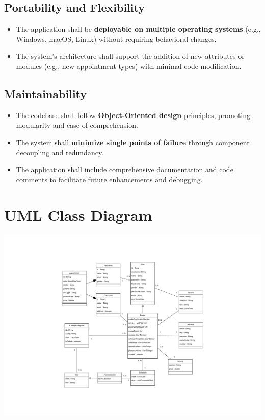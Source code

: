 \subsection{Portability and Flexibility}
\begin{itemize}
	\item The application shall be \textbf{deployable on multiple operating systems} (e.g., Windows, macOS, Linux) without requiring behavioral changes.
	\item The system’s architecture shall support the addition of new attributes or modules (e.g., new appointment types) with minimal code modification.
\end{itemize}

\subsection{Maintainability}
\begin{itemize}
	\item The codebase shall follow \textbf{Object-Oriented design} principles, promoting modularity and ease of comprehension.
	\item The system shall \textbf{minimize single points of failure} through component decoupling and redundancy.
	\item The application shall include comprehensive documentation and code comments to facilitate future enhancements and debugging.
\end{itemize}

\newpage

\section{UML Class Diagram}
\hspace*{-6cm}
\includegraphics[scale=0.7, ]{./resources/healthhub_UML.pdf}

